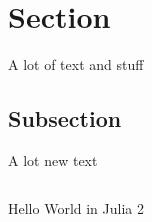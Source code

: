 \section{Section}\label{sec:conclusions-section}
A lot of text and stuff

\subsection{Subsection}\label{sec:conclusions-subsection}
A lot new text

\begin{listing}
    \inputminted{julia}{assets/listings/hello.jl}
    \caption{Hello World in Julia 2}
    \label{lst:julia-2}
\end{listing}
